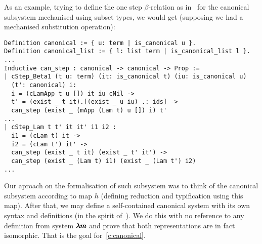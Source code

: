As an example, trying to define the one step $\beta$-relation as in~\cite[Chapter~3.1]{JCES2002} for the canonical subsystem mechanised using subset types, we would get (supposing we had a mechanised substitution operation):
\begin{lstlisting}[language=Coq]
Definition canonical := { u: term | is_canonical u }. 
Definition canonical_list := { l: list term | is_canonical_list l }.
...
Inductive can_step : canonical -> canonical -> Prop :=
| cStep_Beta1 (t u: term) (it: is_canonical t) (iu: is_canonical u)
  (t': canonical) i:
  i = (cLamApp t u []) it iu cNil ->
  t' = (exist _ t it).[(exist _ u iu) .: ids] ->
  can_step (exist _ (mApp (Lam t) u []) i) t'
...
| cStep_Lam t t' it it' i1 i2 :
  i1 = (cLam t) it ->
  i2 = (cLam t') it' ->
  can_step (exist _ t it) (exist _ t' it') ->
  can_step (exist _ (Lam t) i1) (exist _ (Lam t') i2)
...
\end{lstlisting}

Our aproach on the formalisation of such subsystem was to think of the canonical subsystem according to map $h$ (defining reduction and typification using this map).
After that, we may define a self-contained canonical system with its own syntax and definitions (in the spirit of~\cite[Chapter~3.1]{JCES2002}).
We do this with no reference to any definition from system $\pmb{\lambda m}$ and prove that both representations are in fact isomorphic.
That is the goal for~\cref{c:canonical}.

